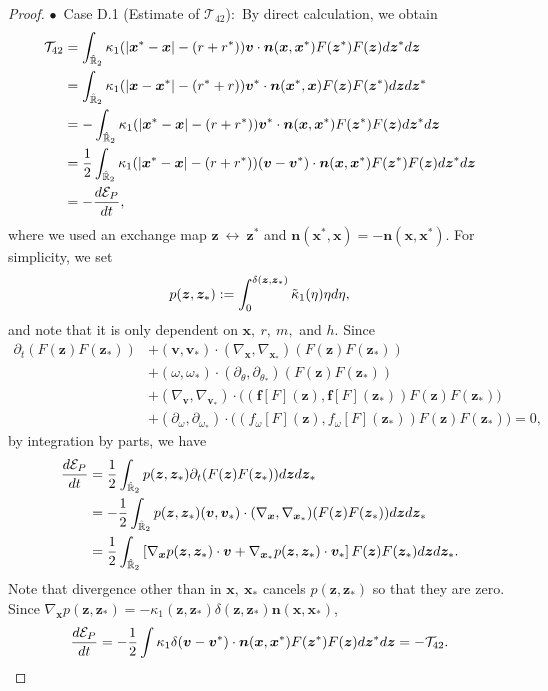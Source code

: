 \documentclass[10pt,a4paper]{amsart}
\def\d{{  \rm d}}
\newcommand{\E}{\mathcal{E}}
\newcommand{\T}{\mathcal{T}}
\newcommand{\bbr}{\mathbb R}
\newcommand{\bff}{\boldsymbol{f}}
\newcommand{\bfn}{\boldsymbol{n}}
\newcommand{\bfv}{\boldsymbol{v}}
\newcommand{\bfx}{\boldsymbol{x}}
\newcommand{\bfz}{\boldsymbol{z}}
\begin{document}
\begin{proof}
\noindent $\bullet$~Case D.1 (Estimate of $\T_{42}$):~By direct calculation, we obtain
\begin{align}
\begin{aligned} \label{eq:T42}
\T_{42} & = \int_{\hat{\bbr}_2}   \kappa_1 (|\bfx^* - \bfx| - (r + r^*)) \bfv \cdot \bfn(\bfx, \bfx^*)  F( \bfz^*) F(\bfz)\d\bfz^* d \bfz   \\
& = \int_{\hat{\bbr}_2}   \kappa_1  (|\bfx - \bfx^*| - (r^* + r)) \bfv^* \cdot \bfn(\bfx^*, \bfx)  F( \bfz) F(\bfz^*)\d\bfz d \bfz^*   \\
&=  -\int_{\hat{\bbr}_2}   \kappa_1  (|\bfx^* - \bfx| - (r + r^*)) \bfv^* \cdot \bfn(\bfx, \bfx^*)  F( \bfz^*) F(\bfz)\d\bfz^* d \bfz   \\
&= \frac{1}{2} \int_{\hat{\bbr}_2}   \kappa_1  (|\bfx^* - \bfx| - (r + r^*))( \bfv - \bfv^*)  \cdot \bfn(\bfx, \bfx^*)  F( \bfz^*) F(\bfz)\d\bfz^* d \bfz \\
&= -\frac{\d \E_P}{\d t},
\end{aligned}
\end{align}
where we used an exchange map $\bfz~\longleftrightarrow~\bfz^*$ and $\bfn(\bfx^*, \bfx) = -\bfn(\bfx, \bfx^*)$. 
For simplicity, we set 
\[
p(\bfz,\bfz_*):=\int_0^{\delta(\bfz,\bfz_*)} \tilde{\kappa}_1(\eta)\eta \d \eta,
\]
and note that it is only dependent on $\bfx,\ r,\ m,$ and $h$.
Since
\begin{align*}
\partial_t(F(\bfz)F(\bfz_*))
&+   (\bfv,\bfv_*)  \cdot (\nabla_{\bfx},\nabla_{\bfx_*}) (F(\bfz)F(\bfz_*))\\
&+ (\omega,\omega_*)\cdot (\partial_\theta, \partial_{\theta_*}) (F(\bfz)F(\bfz_*))\\
&+  (\nabla_{\bfv},\nabla_{\bfv_*}) \cdot \big((\bff[F](\bfz),\bff[F](\bfz_*)) F(\bfz)F(\bfz_*)\big)\\
&+  (\partial_{\omega}, \partial_{\omega_*}) \cdot\big((f_{\omega}[F](\bfz),f_{\omega}[F](\bfz_*)) F(\bfz)F(\bfz_*)\big)= 0,
\end{align*}
by integration by parts, we have
\begin{align*}
\frac{\d \E_P}{\d t}
&= \frac{1}{2}\int_{\hat{\bbr}_2} p(\bfz,\bfz_*)\partial_t(F(\bfz)F(\bfz_*)) \d \bfz\d\bfz_*\\
&= -\frac{1}{2}\int_{\hat{\bbr}_2} p(\bfz,\bfz_*) (\bfv,\bfv_*)  \cdot (\nabla_{\bfx},\nabla_{\bfx_*}) (F(\bfz)F(\bfz_*)) \d \bfz\d\bfz_*\\
&= \frac{1}{2}\int_{\hat{\bbr}_2} \left[\nabla_{\bfx}p(\bfz,\bfz_*)\cdot\bfv+\nabla_{\bfx_*}p(\bfz,\bfz_*)\cdot\bfv_*\right] F(\bfz)F(\bfz_*) \d \bfz\d\bfz_*.
\end{align*}
Note that divergence other than in $\bfx,\ \bfx_*$ cancels $p(\bfz,\bfz_*)$ so that they are zero.
Since $\nabla_{\bfx}p(\bfz,\bfz_*) = -\kappa_1(\bfz,\bfz_*)\delta(\bfz,\bfz_*)\bfn(\bfx,\bfx_*)$, 
\[
\frac{\d \E_P}{\d t}=-\frac{1}{2}\int \kappa_1\delta ( \bfv - \bfv^*)  \cdot \bfn(\bfx, \bfx^*)  F( \bfz^*) F(\bfz) \d\bfz^* \d \bfz=-\mathcal{T}_{42}.
\]
%



\end{proof}
\end{document}
